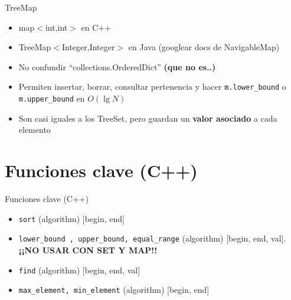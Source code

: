 \documentclass{beamer}
\begin{document}
\begin{frame}{TreeMap}
    \begin{itemize}
        \item map$<$int,int$>$ en C++
        \item TreeMap$<$Integer,Integer$>$ en Java (googlear docs de NavigableMap)
        \item No confundir ``collections.OrderedDict'' \textbf{(que no es..)}
        \item Permiten insertar, borrar, consultar pertenencia y hacer \texttt{m.lower\_bound} o \texttt{m.upper\_bound} en $O(\lg N)$
        \item Son casi iguales a los TreeSet, pero guardan un \textbf{valor asociado} a cada elemento
    \end{itemize}
\end{frame}

\section{Funciones clave (C++)}

\begin{frame}{Funciones clave (C++)}
    \begin{itemize}
        \item \texttt{sort} (algorithm) [begin, end]
        \item \texttt{lower\_bound , upper\_bound, equal\_range} (algorithm) [begin, end, val]. \textbf{¡¡NO USAR CON SET Y MAP!!}
        \item \texttt{find} (algorithm) [begin, end, val]
        \item \texttt{max\_element, min\_element} (algorithm) [begin, end]
    \end{itemize}
\end{frame}
\end{document}
